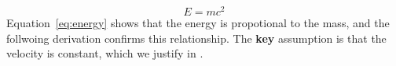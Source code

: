 \begin{equation}
E = mc^2
\end{equation}
Equation~\eqref{eq:energy} shows that the energy is propotional to the mass, and the follwoing derivation confirms this relationship. The \textbf{key} assumption is that the velocity is constant, which we justify in \cite{einstein1905}.
